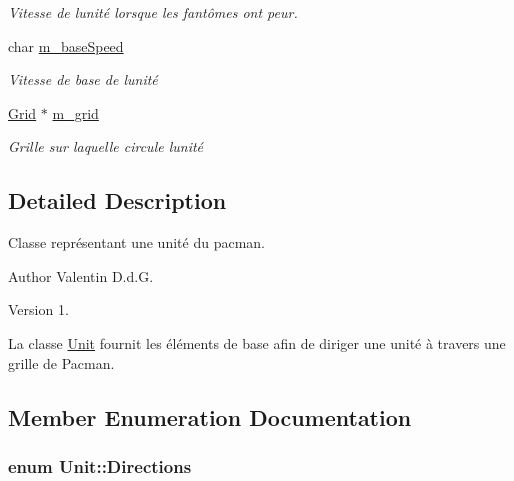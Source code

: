 \begin{DoxyCompactItemize}
\begin{DoxyCompactList}\small\item\em Vitesse de l\textquotesingle{}unité lorsque les fantômes ont peur. \end{DoxyCompactList}\item 
\hypertarget{class_unit_ae7e2ef6ed5459b8783e8698142f6037e}{}char \hyperlink{class_unit_ae7e2ef6ed5459b8783e8698142f6037e}{m\+\_\+base\+Speed}\label{class_unit_ae7e2ef6ed5459b8783e8698142f6037e}

\begin{DoxyCompactList}\small\item\em Vitesse de base de l\textquotesingle{}unité \end{DoxyCompactList}\item 
\hypertarget{class_unit_accaaf0c1e19bf9d254c7c5af96812f34}{}\hyperlink{class_grid}{Grid} $\ast$ \hyperlink{class_unit_accaaf0c1e19bf9d254c7c5af96812f34}{m\+\_\+grid}\label{class_unit_accaaf0c1e19bf9d254c7c5af96812f34}

\begin{DoxyCompactList}\small\item\em Grille sur laquelle circule l\textquotesingle{}unité \end{DoxyCompactList}\end{DoxyCompactItemize}


\subsection{Detailed Description}
Classe représentant une unité du pacman. 

\begin{DoxyAuthor}{Author}
Valentin D.\+d.\+G. 
\end{DoxyAuthor}
\begin{DoxyVersion}{Version}
1.
\end{DoxyVersion}
La classe \hyperlink{class_unit}{Unit} fournit les éléments de base afin de diriger une unité à travers une grille de Pacman. 

\subsection{Member Enumeration Documentation}
\hypertarget{class_unit_a198e5fe8c952e2f1e7e9524a914aa0ed}{}
\subsubsection[{Directions}]{\setlength{\rightskip}{0pt plus 5cm}enum {\bf Unit\+::\+Directions}}\label{class_unit_a198e5fe8c952e2f1e7e9524a914aa0ed}


